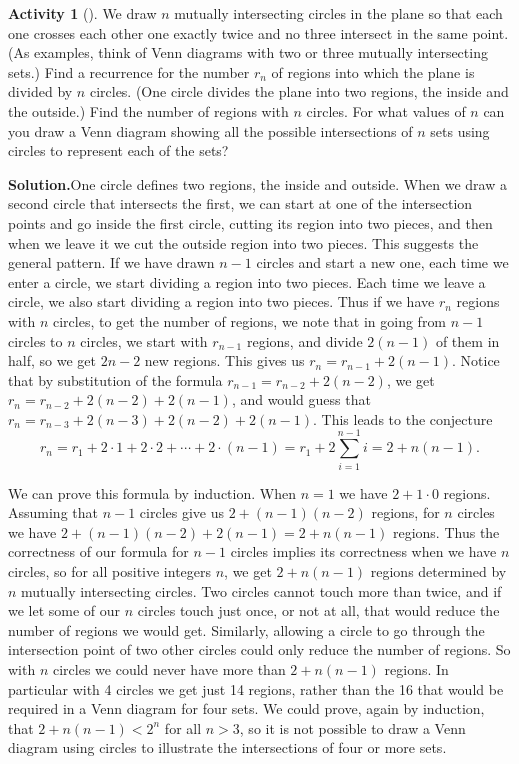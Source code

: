 \documentclass[10pt,]{book}
\theoremstyle{plain}
\theoremstyle{definition}
\newtheorem{activity}[project]{Activity}
\numberwithin{equation}{chapter}
\newcommand{\lt}{<}
\begin{document}
\begin{activity}[]\label{circlesinplane}
We draw \(n\) mutually intersecting circles in the plane so that each one crosses each other one exactly twice and no three intersect in the same point. (As examples, think of Venn diagrams with two or three mutually intersecting sets.) Find a recurrence for the number \(r_n\) of regions into which the plane is divided by \(n\) circles. (One circle divides the plane into two regions, the inside and the outside.) Find the number of regions with \(n\) circles. For what values of \(n\) can you draw a Venn diagram showing all the possible intersections of \(n\) sets using circles to represent each of the sets?%
\par\medskip\noindent%
\textbf{Solution.}\quad One circle defines two regions, the inside and outside. When we draw a second circle that intersects the first, we can start at one of the intersection points and go inside the first circle, cutting its region into two pieces, and then when we leave it we cut the outside region into two pieces. This suggests the general pattern. If we have drawn \(n-1\) circles and start a new one, each time we enter a circle, we start dividing a region into two pieces. Each time we leave a circle, we also start dividing a region into two pieces. Thus if we have \(r_n\) regions with \(n\) circles, to get the number of regions, we note that in going from \(n-1\) circles to \(n\) circles, we start with \(r_{n-1}\) regions, and divide \(2(n-1)\) of them in half, so we get \(2n-2\) new regions. This gives us \(r_n=r_{n-1}+2(n-1)\). Notice that by substitution of the formula \(r_{n-1}=r_{n-2} +2(n-2)\), we get \(r_n=r_{n-2}+ 2(n-2)
+2(n-1)\), and would guess that \(r_n=r_{n-3}+2(n-3)+2(n-2) +2(n-1)\). This leads to the conjecture%
\begin{equation*}
r_n=r_1  +2\cdot1+2\cdot2+\cdots+2\cdot(n-1)=r_1+2\sum_{i=1}^{n-1}
i=2+n(n-1).
\end{equation*}
%
\par
We can prove this formula by induction. When \(n=1\) we have \(2+1\cdot0\) regions. Assuming that \(n-1\) circles give us \(2+(n-1)(n-2)\) regions, for \(n\) circles we have \(2+(n-1)(n-2) +2(n-1)=2+n(n-1)\) regions. Thus the correctness of our formula for \(n-1\) circles implies its correctness when we have \(n\) circles, so for all positive integers \(n\), we get \(2+n(n-1)\) regions determined by \(n\) mutually intersecting circles. Two circles cannot touch more than twice, and if we let some of our \(n\) circles touch just once, or not at all, that would reduce the number of regions we would get. Similarly, allowing a circle to go through the intersection point of two other circles could only reduce the number of regions. So with \(n\) circles we could never have more than \(2+n(n-1)\) regions. In particular with 4 circles we get just 14 regions, rather than the 16 that would be required in a Venn diagram for four sets. We could prove, again by induction, that \(2+n(n-1)\lt 2^n\) for all \(n>3\), so it is not possible to draw a Venn diagram using circles to illustrate the intersections of four or more sets.%
\end{activity}
\end{document}
